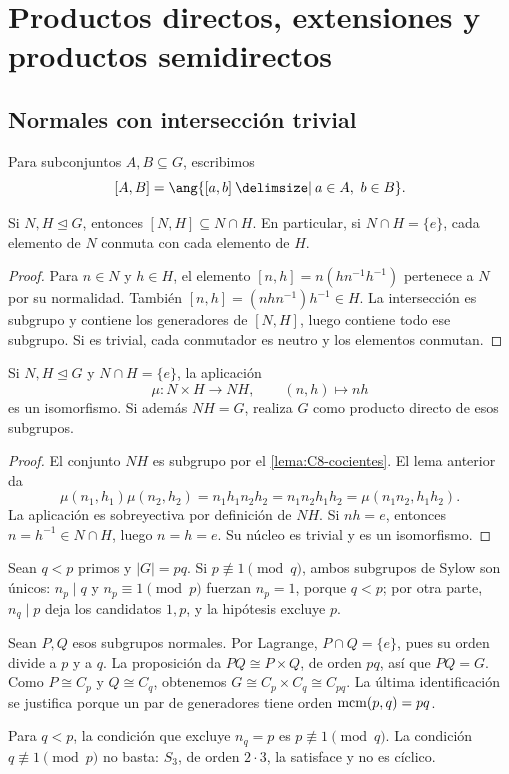 \section{Productos directos, extensiones y productos semidirectos}\label{sec:grupos-productos}

\subsection{Normales con intersección trivial}\label{tema:10-1-1}
Para subconjuntos $A,B\subseteq G$, escribimos
\[
[A,B]=\ang{[a,b]\given a\in A,\ b\in B}.
\]
\begin{lema}\label{lema:C10-conmutan}
Si $N,H\trianglelefteq G$, entonces $[N,H]\subseteq N\cap H$. En particular, si $N\cap H=\{e\}$, cada elemento de $N$ conmuta con cada elemento de $H$.
\end{lema}
\begin{proof}
Para $n\in N$ y $h\in H$, el elemento $[n,h]=n(hn^{-1}h^{-1})$ pertenece a $N$ por su normalidad. También $[n,h]=(nhn^{-1})h^{-1}\in H$. La intersección es subgrupo y contiene los generadores de $[N,H]$, luego contiene todo ese subgrupo. Si es trivial, cada conmutador es neutro y los elementos conmutan.
\end{proof}

\begin{prop}\label{prop:C10-directo}
Si $N,H\trianglelefteq G$ y $N\cap H=\{e\}$, la aplicación
\[
\mu:N\times H\longrightarrow NH,\qquad (n,h)\longmapsto nh
\]
es un isomorfismo. Si además $NH=G$, realiza $G$ como producto directo de esos subgrupos.
\end{prop}
\begin{proof}
El conjunto $NH$ es subgrupo por el \cref{lema:C8-cocientes}. El lema anterior da
\[
\mu(n_1,h_1)\mu(n_2,h_2)=n_1h_1n_2h_2
=n_1n_2h_1h_2=\mu(n_1n_2,h_1h_2).
\]
La aplicación es sobreyectiva por definición de $NH$. Si $nh=e$, entonces $n=h^{-1}\in N\cap H$, luego $n=h=e$. Su núcleo es trivial y es un isomorfismo.
\end{proof}

\begin{ejem}
Sean $q<p$ primos y $|G|=pq$. Si \mbox{$p\not\equiv1\pmod q$}, ambos subgrupos de Sylow son únicos: $n_p\mid q$ y $n_p\equiv1\pmod p$ fuerzan $n_p=1$, porque $q<p$; por otra parte, $n_q\mid p$ deja los candidatos $1,p$, y la hipótesis excluye $p$.

Sean $P,Q$ esos subgrupos normales. Por Lagrange, $P\cap Q=\{e\}$, pues su orden divide a $p$ y a $q$. La proposición da $PQ\cong P\times Q$, de orden $pq$, así que $PQ=G$. Como $P\cong C_p$ y $Q\cong C_q$, obtenemos $G\cong C_p\times C_q\cong C_{pq}$. La última identificación se justifica porque un par de generadores tiene orden $\operatorname{mcm}(p,q)=pq$.
\end{ejem}
\begin{obs}
Para $q<p$, la condición que excluye $n_q=p$ es $p\not\equiv1\pmod q$. La condición $q\not\equiv1\pmod p$ no basta: $S_3$, de orden $2\cdot3$, la satisface y no es cíclico.
\end{obs}

